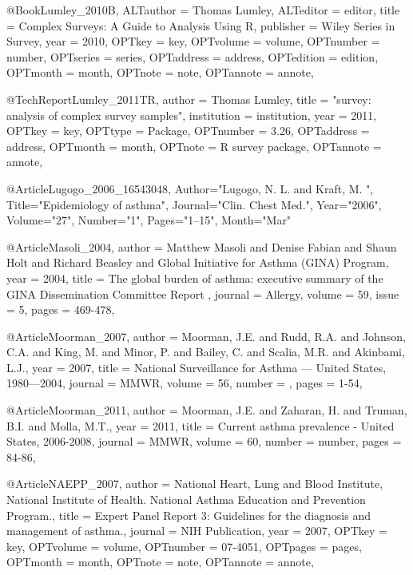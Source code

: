 {{{@Book{Lumley_2010B,
ALTauthor = {Thomas Lumley},
ALTeditor = {editor},
title = {Complex Surveys: A Guide to Analysis Using R},
publisher = {Wiley Series in Survey},
year = {2010},
OPTkey = {key},
OPTvolume = {volume},
OPTnumber = {number},
OPTseries = {series},
OPTaddress = {address},
OPTedition = {edition},
OPTmonth = {month},
OPTnote = {note},
OPTannote = {annote},
}

@TechReport{Lumley_2011TR,
author = {Thomas Lumley},
title = {"survey: analysis of complex survey samples"},
institution = {institution},
year = {2011},
OPTkey = {key},
OPTtype = {Package},
OPTnumber = {3.26},
OPTaddress = {address},
OPTmonth = {month},
OPTnote = {R survey package},
OPTannote = {annote},
}


@Article{Lugogo_2006_16543048,
   Author="Lugogo, N. L.  and Kraft, M. ",
   Title="{{E}pidemiology of asthma}",
   Journal="Clin. Chest Med.",
   Year="2006",
   Volume="27",
   Number="1",
   Pages="1--15",
   Month="Mar"
}


@Article{Masoli_2004,
  author = {Matthew Masoli and Denise Fabian and Shaun Holt and Richard Beasley and Global Initiative for Asthma (GINA) Program},
  year = {2004},
  title = {The global burden of asthma: executive summary of the GINA Dissemination Committee Report
  },
  journal = Allergy,
  volume =  {59},
  issue = {5},
  pages = {469-478},
}

@Article{Moorman_2007,
  author = {Moorman, J.E. and Rudd, R.A. and Johnson, C.A. and King, M. and Minor, P. and Bailey, C. and Scalia, M.R. and Akinbami, L.J.},
  year = {2007},
  title = {National Surveillance for Asthma --- United States, 1980—2004},
  journal = MMWR,
  volume =  {56},
  number = {},
  pages = {1-54},
}


@Article{Moorman_2011,
  author = {Moorman, J.E. and Zaharan, H. and Truman, B.I. and Molla, M.T.},
  year = {2011},
  title = {Current asthma prevalence - United States, 2006-2008},
  journal = MMWR,
  volume =  {60},
  number = {number},
  pages = {84-86},
}


@Article{NAEPP_2007,
author = {National Heart, Lung and Blood Institute, National Institute of Health. National Asthma Education and Prevention Program.},
title = {Expert Panel Report 3: Guidelines for the diagnosis and management of asthma.},
journal = {NIH Publication},
year = {2007},
OPTkey = {key},
OPTvolume = {volume},
OPTnumber = {07-4051},
OPTpages = {pages},
OPTmonth = {month},
OPTnote = {note},
OPTannote = {annote},
}

}}}
